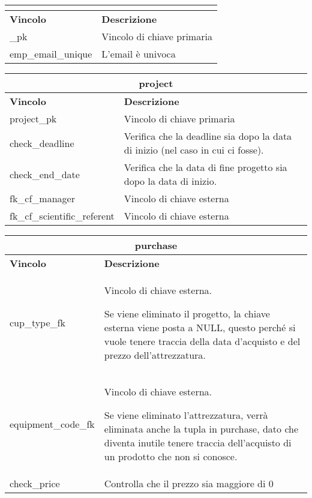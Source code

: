 \begin{tabular}{@{}| p{} | p{} |@{}} %
	\hline
	\multicolumn{2}{|c|}{\textbf{\projectsalaried}}   \\
	\hline
	\textbf{Vincolo}     & \textbf{Descrizione}       \\
	\hline
	\projectsalaried\_pk & Vincolo di chiave primaria \\
	\hline
	emp\_email\_unique   & L'email è univoca          \\
	\hline
\end{tabular}\bskip
\begin{tabular}{@{}| p{} | p{} |@{}} %
	\hline
	\multicolumn{2}{|c|}{\textbf{project}}                                                                         \\
	\hline
	\textbf{Vincolo}             & \textbf{Descrizione}                                                            \\
	\hline
	project\_pk                  & Vincolo di chiave primaria                                                      \\
	\hline
	check\_deadline              & Verifica che la deadline sia dopo la data di inizio (nel caso in cui ci fosse). \\
	\hline
	check\_end\_date             & Verifica che la data di fine progetto sia dopo la data di inizio.               \\
	\hline
	fk\_cf\_manager              & Vincolo di chiave esterna                                                       \\
	\hline
	fk\_cf\_scientific\_referent & Vincolo di chiave esterna                                                       \\
	\hline
\end{tabular}\bskip
\begin{tabular}{@{}| p{} | p{} |@{}} %
	\hline
	\multicolumn{2}{|c|}{\textbf{purchase}}                                                                                                                                 \\
	\hline
	\textbf{Vincolo}    & \textbf{Descrizione}                                                                                                                              \\
	\hline
	cup\_type\_fk       & Vincolo di chiave esterna.

	Se viene eliminato il progetto, la chiave esterna viene posta a NULL, questo perché si vuole tenere traccia della data d'acquisto e del prezzo dell'attrezzatura.       \\
	\hline
	equipment\_code\_fk & Vincolo di chiave esterna.

	Se viene eliminato l'attrezzatura, verrà eliminata anche la tupla in purchase, dato che diventa inutile tenere traccia dell'acquisto di un prodotto che non si conosce. \\
	\hline
	check\_price        & Controlla che il prezzo sia maggiore di $0$                                                                                                       \\
	\hline
\end{tabular}\bskip
